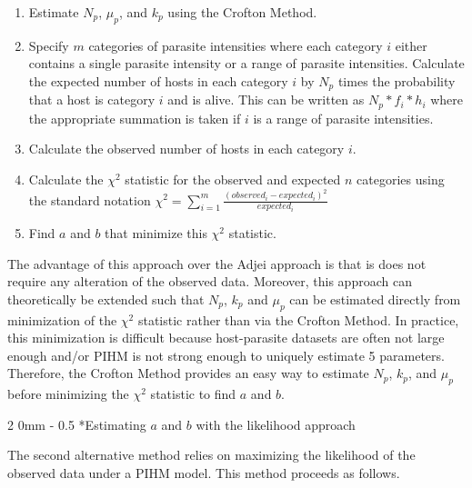 \documentclass[12pt, a4paper]{article}
\makeatletter
\renewcommand{\subsection}{\@startsection
{subsection}%
{2}%
{0mm}%
{-\baselineskip}%
{0.5\baselineskip}%
{\normalfont\bf}} %
\makeatother
\begin{document}
\singlespacing
\begin{enumerate}
    \item Estimate $N_p$, $\mu_p$, and $k_p$ using the Crofton Method.
    \item Specify $m$ categories of parasite intensities where each category $i$ either contains a single parasite intensity or a range of parasite intensities.   Calculate the expected number of hosts in each category $i $ by $N_p$ times the probability that a host is category $i$ and is alive.  This can be written as $N_p * f_i * h_i$ where the appropriate summation is taken if $i$ is a range of parasite intensities.
    \item Calculate the observed number of hosts in each category $i$.
    \item Calculate the $\chi^2$ statistic for the observed and expected $n$ categories using the standard notation $\chi^2 = \sum_{i=1}^m \frac{(observed_i - expected_i)^2}{expected_i}$
    \item Find $a$ and $b$ that minimize this $\chi^2$ statistic.
\end{enumerate}

\doublespacing
The advantage of this approach over the Adjei approach is that is does not require any alteration of the observed data. Moreover, this approach can theoretically be extended such that $N_p$, $k_p$ and $\mu_p$ can be estimated directly from minimization of the $\chi^2$ statistic rather than via the Crofton Method.  In practice, this minimization is difficult because host-parasite datasets are often not large enough and/or PIHM is not strong enough to uniquely estimate 5 parameters.  Therefore, the Crofton Method provides an easy way to estimate $N_p$, $k_p$, and $\mu_p$ before minimizing the $\chi^2$ statistic to find $a$ and $b$.

\subsection*{Estimating $a$ and $b$ with the likelihood approach}

The second alternative method relies on maximizing the likelihood of the observed data under a PIHM model.  This method proceeds as follows.
\end{document}
